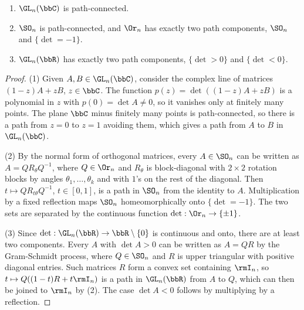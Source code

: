\begin{prop}\label{prop components of GLn}
    \begin{enumerate}
        \item $\GL_n(\bbC)$ is path-connected.
        \item $\SO_n$ is path-connected, and $\Or_n$ has exactly two path components, $\SO_n$ and $\{\det=-1\}$.
        \item $\GL_n(\bbR)$ has exactly two path components, $\{\det>0\}$ and $\{\det<0\}$.
    \end{enumerate}
\end{prop}
\begin{proof}
    (1) Given $A,B\in\GL_n(\bbC)$, consider the complex line of matrices $(1-z)A+zB$, $z\in\bbC$. The function $p(z)=\det((1-z)A+zB)$ is a polynomial in $z$ with $p(0)=\det A\neq0$, so it vanishes only at finitely many points. The plane $\bbC$ minus finitely many points is path-connected, so there is a path from $z=0$ to $z=1$ avoiding them, which gives a path from $A$ to $B$ in $\GL_n(\bbC)$.

    (2) By the normal form of orthogonal matrices, every $A\in\SO_n$ can be written as $A=QR_\theta Q^{-1}$, where $Q\in\Or_n$ and $R_\theta$ is block-diagonal with $2\times2$ rotation blocks by angles $\theta_1,\ldots,\theta_k$ and with $1$'s on the rest of the diagonal. Then $t\mapsto QR_{t\theta}Q^{-1}$, $t\in[0,1]$, is a path in $\SO_n$ from the identity to $A$. Multiplication by a fixed reflection maps $\SO_n$ homeomorphically onto $\{\det=-1\}$. The two sets are separated by the continuous function $\det:\Or_n\to\{\pm1\}$.

    (3) Since $\det:\GL_n(\bbR)\to\bbR\setminus\{0\}$ is continuous and onto, there are at least two components. Every $A$ with $\det A>0$ can be written as $A=QR$ by the Gram-Schmidt process, where $Q\in\SO_n$ and $R$ is upper triangular with positive diagonal entries. Such matrices $R$ form a convex set containing $\rmI_n$, so $t\mapsto Q((1-t)R+t\rmI_n)$ is a path in $\GL_n(\bbR)$ from $A$ to $Q$, which can then be joined to $\rmI_n$ by (2). The case $\det A<0$ follows by multiplying by a reflection.
\end{proof}

